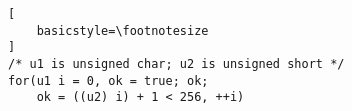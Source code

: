\begin{lstlisting}[
    basicstyle=\footnotesize
]
/* u1 is unsigned char; u2 is unsigned short */
for(u1 i = 0, ok = true; ok; 
    ok = ((u2) i) + 1 < 256, ++i)
\end{lstlisting}%
